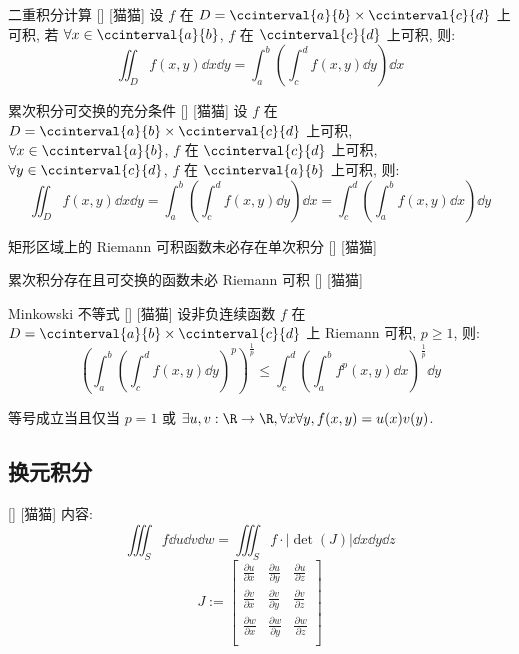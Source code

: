 \documentclass[UTF8]{ctexart}
\begin{document}
			\begin{thm}
			    []
			    {二重积分计算}
			    []
			    [猫猫]
				设 \(f\) 在 \(D=\ccinterval{a}{b}\times\ccinterval{c}{d}\) 上可积, 若 \(\forall x\in\ccinterval{a}{b}\), \(f\) 在 \(\ccinterval{c}{d}\) 上可积, 则: 
				\[\iint_{D}f(x,y)\dd x\dd y=\int_{a}^{b}\left(\int_{c}^{d}f(x,y)\dd y\right)\dd x\]
			\end{thm}

			\begin{crl}
			    []
			    {累次积分可交换的充分条件}
			    []
			    [猫猫]
				设 \(f\) 在 \(D=\ccinterval{a}{b}\times\ccinterval{c}{d}\) 上可积, \(\forall x\in\ccinterval{a}{b}\), \(f\) 在 \(\ccinterval{c}{d}\) 上可积, \(\forall y\in\ccinterval{c}{d}\), \(f\) 在 \(\ccinterval{a}{b}\) 上可积, 则: 
				\[\iint_{D}f(x,y)\dd x\dd y=\int_{a}^{b}\left(\int_{c}^{d}f(x,y)\dd y\right)\dd x=\int_{c}^{d}\left(\int_{a}^{b}f(x,y)\dd x\right)\dd y\]
			\end{crl}

			\begin{cxmp}
			    []
			    {矩形区域上的 Riemann 可积函数未必存在单次积分}
			    []
			    [猫猫]
			\end{cxmp}

			\begin{cxmp}
			    []
			    {累次积分存在且可交换的函数未必 Riemann 可积}
			    []
			    [猫猫]
			\end{cxmp}

			\begin{thm}
			    []
			    {Minkowski 不等式}
			    []
			    [猫猫]
				设非负连续函数 \(f\) 在 \(D=\ccinterval{a}{b}\times\ccinterval{c}{d}\) 上 Riemann 可积, \(p\geq 1\), 则: 
				\[{\left(\int_a^b{\left(\int_c^d f(x,y)\dd y\right)}^p\right)}^{\frac{1}{p}}
				\leq
				\int_c^d{\left(\int_a^b f^p(x,y)\dd x\right)}^{\frac{1}{p}}\dd y\]

				等号成立当且仅当 \(p=1\) 或 \(\exists u,v:\R\to\R, \forall x\forall y, f(x,y)=u(x)v(y)\). 
			\end{thm}

		\subsection{换元积分}
			
			\begin{thm}
				[]
				{}
				[]
				[猫猫]
				内容: 
				\[\iiint_S f \dd u\dd v\dd w=\iiint_S f\cdot|\det(J)|\dd x\dd y\dd z\]
				\[J:=
				\begin{bmatrix}
					\frac{\partial u}{\partial x} & \frac{\partial u}{\partial y} & \frac{\partial u}{\partial z}\\
					\frac{\partial v}{\partial x} & \frac{\partial v}{\partial y} & \frac{\partial v}{\partial z}\\
					\frac{\partial w}{\partial x} & \frac{\partial w}{\partial y} & \frac{\partial w}{\partial z}\\
				\end{bmatrix}\]
			\end{thm}
		
\end{document}
